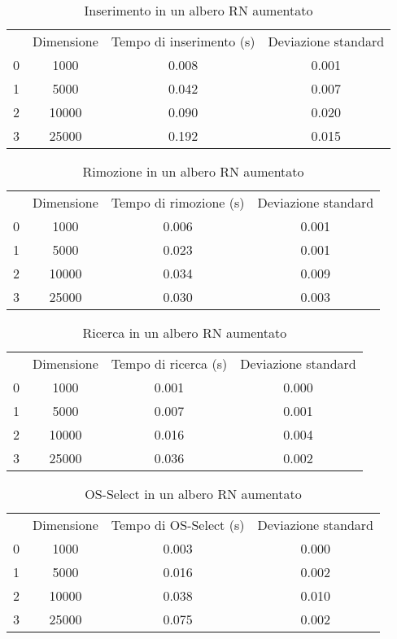 \begin{table}[H]
\centering
\caption{Inserimento in un albero RN aumentato}
\label{Inserimento in un albero RN aumentato}
\begin{tabular}{cccc}
 & Dimensione & Tempo di inserimento (s) & Deviazione standard \\
0 & 1000 & 0.008 & 0.001 \\
\cline{1-4}
1 & 5000 & 0.042 & 0.007 \\
\cline{1-4}
2 & 10000 & 0.090 & 0.020 \\
\cline{1-4}
3 & 25000 & 0.192 & 0.015 \\
\cline{1-4}
\end{tabular}
\end{table}

\begin{table}[H]
\centering
\caption{Rimozione in un albero RN aumentato}
\label{Rimozione in un albero RN aumentato}
\begin{tabular}{cccc}
 & Dimensione & Tempo di rimozione (s) & Deviazione standard \\
0 & 1000 & 0.006 & 0.001 \\
\cline{1-4}
1 & 5000 & 0.023 & 0.001 \\
\cline{1-4}
2 & 10000 & 0.034 & 0.009 \\
\cline{1-4}
3 & 25000 & 0.030 & 0.003 \\
\cline{1-4}
\end{tabular}
\end{table}

\begin{table}[H]
\centering
\caption{Ricerca in un albero RN aumentato}
\label{Ricerca in un albero RN aumentato}
\begin{tabular}{cccc}
 & Dimensione & Tempo di ricerca (s) & Deviazione standard \\
0 & 1000 & 0.001 & 0.000 \\
\cline{1-4}
1 & 5000 & 0.007 & 0.001 \\
\cline{1-4}
2 & 10000 & 0.016 & 0.004 \\
\cline{1-4}
3 & 25000 & 0.036 & 0.002 \\
\cline{1-4}
\end{tabular}
\end{table}

\begin{table}[H]
\centering
\caption{OS-Select in un albero RN aumentato}
\label{OS-Select in un albero RN aumentato}
\begin{tabular}{cccc}
 & Dimensione & Tempo di OS-Select (s) & Deviazione standard \\
0 & 1000 & 0.003 & 0.000 \\
\cline{1-4}
1 & 5000 & 0.016 & 0.002 \\
\cline{1-4}
2 & 10000 & 0.038 & 0.010 \\
\cline{1-4}
3 & 25000 & 0.075 & 0.002 \\
\cline{1-4}
\end{tabular}
\end{table}

